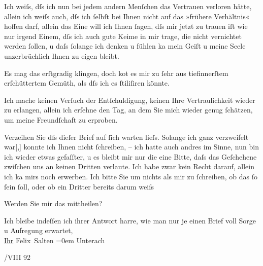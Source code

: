 \pstart
           Ich weiſs, dſs ich nun bei jedem andern Menſchen das Vertrauen verloren hätte, allein
               ich weiſs auch, dſs ich ſelbſt bei Ihnen nicht {\pb}auf das »frühere Verhältnis«
               hoffen darf, allein das Eine will ich Ihnen ſagen, dſs mir jetzt zu trauen iſt wie
               nur irgend Einem, dſs ich auch gute Keime in mir trage, die nicht vernichtet werden
               ſollen, u daſs ſolange ich denken u fühlen ka{\geminationn} mein
               Geiſt u meine Seele unzerbrüchlich Ihnen zu eigen bleibt.\pend
           
\pstart
           Es mag das erſtgradig klingen, doch ko{\geminationm}t es mir zu ſehr
               aus tiefinnerſtem erſchüttertem Gemüth, als dſs ich es ſtiliſiren könnte.\pend
           
\pstart
           Ich mache keinen Verſuch der Entſchuldigung, keinen Ihre Vertraulichkeit wieder zu
                  er{\pb}langen, allein ich
               erſehne den Tag, an dem Sie mich wieder genug ſchätzen, um meine Freundſchaft zu
               erproben.\pend
           
\pstart
           Verzeihen Sie dſs dieſer Brief auf ſich warten lieſs. Solange ich ganz verzweifelt
                  war{[},{]} konnte ich Ihnen nicht ſchreiben, – ich hatte auch
               andres im Sinne, nun bin ich wieder etwas gefaſſter, u es bleibt mir nur die eine
               Bitte, daſs das Geſchehene zwiſchen uns an keinen Dritten verlaute. Ich habe zwar
               kein Recht darauf, allein ich ka{\geminationn} mirs noch erwerben.
               Ich bitte Sie um nichts als mir zu ſchreiben, ob das ſo ſein ſoll, oder ob ein {\pb}Dritter bereits darum
               weiſs\pend
           
\pstart
           Werden Sie mir das mittheilen?\pend
           
\pstart
           Ich bleibe indeſſen ich ihrer Antwort harre, wie man nur je einen Brief voll
               Sorge u Aufregung erwartet, {\\[\baselineskip]}\uline{Ihr}{ }\spacefill\mbox{Felix Salten}\pend
           \leftskip=0em{}
\pstart
           \noindent{}Unterach\pend
           
/VIII 92\pend
           \endnumbering{}  
      